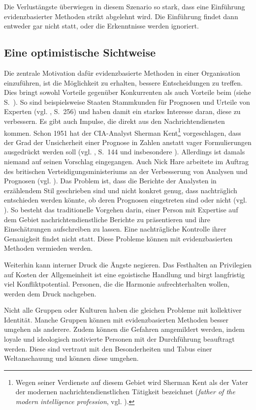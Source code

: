 Die Verlustängste überwiegen in diesem Szenario so stark, dass eine Einführung
evidenzbasierter Methoden strikt abgelehnt wird. Die Einführung findet dann
entweder gar nicht statt, oder die Erkenntnisse werden ignoriert.

\subsection{Eine optimistische Sichtweise}

Die zentrale Motivation dafür evidenzbasierte Methoden in einer Organisation
einzuführen, ist die Möglichkeit zu erhalten, bessere Entscheidungen zu treffen.
Dies bringt sowohl Vorteile gegenüber Konkurrenten als auch Vorteile beim
\grqq{} (siehe S.~\xcom). So sind beispielsweise Staaten Stammkunden
für Prognosen und Urteile von Experten (vgl. \cite{Roetheli}, S.~256) und haben damit ein
starkes Interesse daran, diese zu verbessern. Es gibt auch Impulse, die direkt aus den Nachrichtendiensten
kommen. Schon 1951 hat der CIA-Analyst Sherman Kent\footnote{
Wegen seiner Verdienste auf diesem Gebiet wird Sherman Kent als der Vater der modernen
nachrichtendienstlichen Tätigkeit bezeichnet (\emph{father of the modern intelligence profession},
vgl. \cite{Ford}).
} vorgeschlagen, dass der Grad der Unsicherheit einer Prognose in Zahlen anstatt vager Formulierungen
ausgedrückt werden soll (vgl. \cite{Roche}, S.~144 und insbesondere \cite{Kent}).
Allerdings ist damals niemand auf seinen Vorschlag eingegangen. Auch Nick Hare
arbeitete im Auftrag des britischen Verteidigungsministeriums an der Verbesserung von Analysen und
Prognosen (vgl. \cite{Burton}). Das Problem ist, dass die Berichte der Analysten in erzählendem Stil
geschrieben sind und nicht konkret genug, dass nachträglich entschieden werden könnte, ob deren Prognosen
eingetreten sind oder nicht (vgl. \cite{Burton}). So besteht das traditionelle Vorgehen darin, einer
Person mit Expertise auf dem Gebiet nachrichtendienstliche Berichte zu präsentieren und ihre Einschätzungen
aufschreiben zu lassen. Eine nachträgliche Kontrolle ihrer Genauigkeit findet nicht statt. Diese Probleme
können mit evidenzbasierten Methoden vermieden werden.

Weiterhin kann interner Druck die Ängste negieren.
Das Festhalten an Privilegien auf Kosten der Allgemeinheit ist eine
egoistische Handlung und birgt langfristig viel Konfliktpotential. Personen, die die
Harmonie aufrechterhalten wollen, werden dem Druck nachgeben. 

Nicht alle Gruppen oder Kulturen haben die gleichen Probleme mit kollektiver Identität.
Manche Gruppen können mit evidenzbasierten Methoden besser umgehen als anderere.
Zudem können die Gefahren amgemildert werden, indem loyale und ideologisch motivierte
Personen mit der Durchführung beauftragt werden. Diese sind vertraut mit den
Besonderheiten und Tabus einer Weltanschauung und können diese umgehen.

